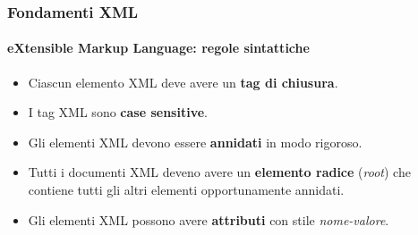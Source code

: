 \begin{frame}
	\frametitle{Fondamenti XML}
	\framesubtitle{eXtensible Markup Language: regole sintattiche}
	\addtocounter{nframe}{1}

	\begin{itemize}

		\item Ciascun elemento XML deve avere un \textbf{tag di chiusura}.

		\item I tag XML sono \textbf{case sensitive}.

		\item Gli elementi XML devono essere \textbf{annidati} in modo rigoroso.

		\item Tutti i documenti XML deveno avere un \textbf{elemento radice} (\textit{root}) che contiene tutti gli altri elementi opportunamente annidati.

		\item Gli elementi XML possono avere \textbf{attributi} con stile \textit{nome-valore}.
		
	\end{itemize}

\end{frame}


